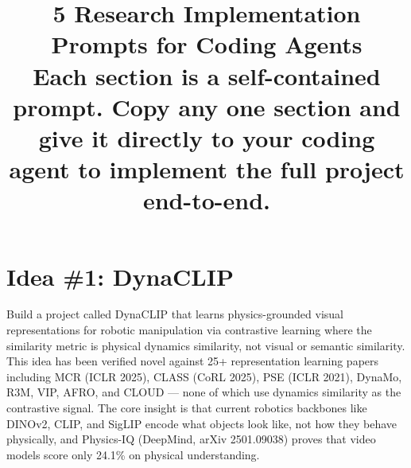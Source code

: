 \documentclass[11pt,a4paper]{article}
\title{\textbf{5 Research Implementation Prompts for Coding Agents}\\[5pt]
\large Each section is a self-contained prompt. Copy any one section and give it directly to your coding agent to implement the full project end-to-end.}
\author{}
\date{}
\begin{document}
\maketitle

\section{Idea \#1: DynaCLIP}

Build a project called DynaCLIP that learns physics-grounded visual representations for robotic manipulation via contrastive learning where the similarity metric is physical dynamics similarity, not visual or semantic similarity. This idea has been verified novel against 25+ representation learning papers including MCR (ICLR 2025), CLASS (CoRL 2025), PSE (ICLR 2021), DynaMo, R3M, VIP, AFRO, and CLOUD --- none of which use dynamics similarity as the contrastive signal. The core insight is that current robotics backbones like DINOv2, CLIP, and SigLIP encode what objects look like, not how they behave physically, and Physics-IQ (DeepMind, arXiv 2501.09038) proves that video models score only 24.1\% on physical understanding.
\end{document}
